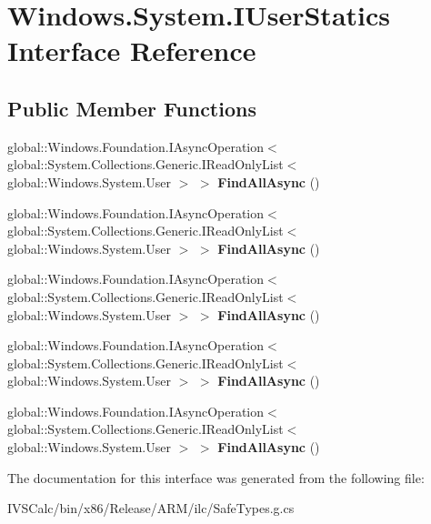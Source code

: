 \hypertarget{interface_windows_1_1_system_1_1_i_user_statics}{}\section{Windows.\+System.\+I\+User\+Statics Interface Reference}
\label{interface_windows_1_1_system_1_1_i_user_statics}
\subsection*{Public Member Functions}
\begin{DoxyCompactItemize}
\item 
\mbox{\label{interface_windows_1_1_system_1_1_i_user_statics_a000025481becad5269901b39376287f8}} 
global\+::\+Windows.\+Foundation.\+I\+Async\+Operation$<$ global\+::\+System.\+Collections.\+Generic.\+I\+Read\+Only\+List$<$ global\+::\+Windows.\+System.\+User $>$ $>$ {\bfseries Find\+All\+Async} ()
\item 
\mbox{\label{interface_windows_1_1_system_1_1_i_user_statics_a000025481becad5269901b39376287f8}} 
global\+::\+Windows.\+Foundation.\+I\+Async\+Operation$<$ global\+::\+System.\+Collections.\+Generic.\+I\+Read\+Only\+List$<$ global\+::\+Windows.\+System.\+User $>$ $>$ {\bfseries Find\+All\+Async} ()
\item 
\mbox{\label{interface_windows_1_1_system_1_1_i_user_statics_a000025481becad5269901b39376287f8}} 
global\+::\+Windows.\+Foundation.\+I\+Async\+Operation$<$ global\+::\+System.\+Collections.\+Generic.\+I\+Read\+Only\+List$<$ global\+::\+Windows.\+System.\+User $>$ $>$ {\bfseries Find\+All\+Async} ()
\item 
\mbox{\label{interface_windows_1_1_system_1_1_i_user_statics_a000025481becad5269901b39376287f8}} 
global\+::\+Windows.\+Foundation.\+I\+Async\+Operation$<$ global\+::\+System.\+Collections.\+Generic.\+I\+Read\+Only\+List$<$ global\+::\+Windows.\+System.\+User $>$ $>$ {\bfseries Find\+All\+Async} ()
\item 
\mbox{\label{interface_windows_1_1_system_1_1_i_user_statics_a000025481becad5269901b39376287f8}} 
global\+::\+Windows.\+Foundation.\+I\+Async\+Operation$<$ global\+::\+System.\+Collections.\+Generic.\+I\+Read\+Only\+List$<$ global\+::\+Windows.\+System.\+User $>$ $>$ {\bfseries Find\+All\+Async} ()
\end{DoxyCompactItemize}


The documentation for this interface was generated from the following file\+:\begin{DoxyCompactItemize}
\item 
I\+V\+S\+Calc/bin/x86/\+Release/\+A\+R\+M/ilc/Safe\+Types.\+g.\+cs\end{DoxyCompactItemize}
